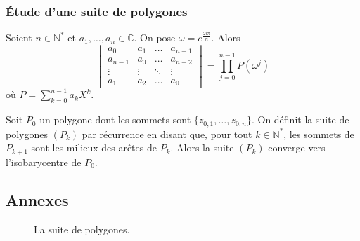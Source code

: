 	\subsubsection{Étude d'une suite de polygones}


	\begin{lemma}
		Soient $n \in \mathbb{N}^*$ et $a_1, \dots, a_n \in \mathbb{C}$. On pose $\omega = e^{\frac{2i\pi}{n}}$. Alors
		\[ \begin{vmatrix} a_0 & a_1 & \dots & a_{n-1} \\ a_{n-1} & a_0 & \dots & a_{n-2}\\ \vdots & \vdots & \ddots & \vdots \\ a_1 & a_2 & \dots & a_0 \end{vmatrix} = \prod_{j=0}^{n-1} P(\omega^j) \]
		où $P = \sum_{k=0}^{n-1} a_k X^k$.
	\end{lemma}


	\begin{application}
		Soit $P_0$ un polygone dont les sommets sont $\{ z_{0,1}, \dots, z_{0,n} \}$. On définit la suite de polygones $(P_k)$ par récurrence en disant que, pour tout $k \in \mathbb{N}^*$, les sommets de $P_{k+1}$ sont les milieux des arêtes de $P_k$.
		\newpar
		Alors la suite $(P_k)$ converge vers l'isobarycentre de $P_0$.
	\end{application}

	\newpage
	\subsection*{Annexes}


	\begin{figure}[h]
		\begin{center}
		\end{center}
		\caption{La suite de polygones.}
	\end{figure}

